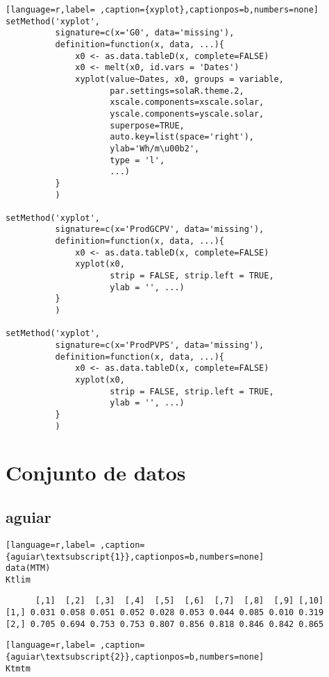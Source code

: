 \begin{lstlisting}[language=r,label= ,caption={xyplot},captionpos=b,numbers=none]
setMethod('xyplot',
          signature=c(x='G0', data='missing'),
          definition=function(x, data, ...){
              x0 <- as.data.tableD(x, complete=FALSE)              
              x0 <- melt(x0, id.vars = 'Dates')
              xyplot(value~Dates, x0, groups = variable,
                     par.settings=solaR.theme.2,
                     xscale.components=xscale.solar,
                     yscale.components=yscale.solar,
                     superpose=TRUE,
                     auto.key=list(space='right'),
                     ylab='Wh/m\u00b2',
                     type = 'l',
                     ...)     
          }
          )

setMethod('xyplot',
          signature=c(x='ProdGCPV', data='missing'),
          definition=function(x, data, ...){
              x0 <- as.data.tableD(x, complete=FALSE)
              xyplot(x0,
                     strip = FALSE, strip.left = TRUE,
                     ylab = '', ...)
          }
          )

setMethod('xyplot',
          signature=c(x='ProdPVPS', data='missing'),
          definition=function(x, data, ...){
              x0 <- as.data.tableD(x, complete=FALSE)
              xyplot(x0,
                     strip = FALSE, strip.left = TRUE,
                     ylab = '', ...)
          }
          )
\end{lstlisting}
\section{Conjunto de datos}
\label{sec:org054add8}
\label{sec:conjunto-datos}
\subsection{aguiar}
\label{sec:org18e68ce}
\label{subsec:aguiar}
\begin{lstlisting}[language=r,label= ,caption={aguiar\textsubscript{1}},captionpos=b,numbers=none]
data(MTM)
Ktlim
\end{lstlisting}

\begin{verbatim}
      [,1]  [,2]  [,3]  [,4]  [,5]  [,6]  [,7]  [,8]  [,9] [,10]
[1,] 0.031 0.058 0.051 0.052 0.028 0.053 0.044 0.085 0.010 0.319
[2,] 0.705 0.694 0.753 0.753 0.807 0.856 0.818 0.846 0.842 0.865
\end{verbatim}


\begin{lstlisting}[language=r,label= ,caption={aguiar\textsubscript{2}},captionpos=b,numbers=none]
Ktmtm
\end{lstlisting}

